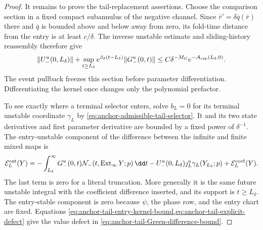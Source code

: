\begin{proof}
It remains to prove the tail-replacement assertions.  Choose the comparison
section in a fixed compact subannulus of the negative channel.  Since
\(\bar r'=\delta\bar q(\bar r)\) there and \(\bar q\) is bounded above and
below away from zero, its fold-time distance from the entry is at least
\(c/\delta\).  The inverse unstable estimate and sliding-history
reassembly therefore give
\begin{equation}
 \|U_-^u(0,L_\delta)\|
 +\sup_{t\ge L_\delta}
    e^{\beta_\delta(t-L_\delta)}
      \|G_-^u(0,t)\|
 \le C\delta^{-M_G}
       e^{-\mathcal A_{\rm cap}(L_\delta,0)}.        \label{eq:anchor-tail-entry-kernel-bound}
\end{equation}
The event pullback freezes this section before parameter differentiation.
Differentiating the kernel once changes only the polynomial prefactor.

To see exactly where a terminal selector enters, solve
\(b_L=0\) for its terminal unstable coordinate
\(\gamma_L\) by
\cref{eq:anchor-admissible-tail-selector}.  It and its two state
derivatives and first parameter derivative are bounded by a fixed power of
\(\delta^{-1}\).  The entry-unstable component of the difference between
the infinite and finite mixed maps is
\begin{equation}
 \mathcal E_L^{\rm ent}(Y)
 =-\int_{L_\delta}^{\infty}
       G_-^u(0,t)\mathcal N_-
          (t,\operatorname{Ext}_\infty Y;p)\,\dd t
   -U_-^u(0,L_\delta)\jmath_L^u
       \gamma_L(Y_{L_\delta};p)
   +\mathcal E_L^{\rm coef}(Y).                    \label{eq:anchor-tail-explicit-defect}
\end{equation}
The last term is zero for a literal truncation.  More generally it is the
same future unstable integral with the coefficient difference inserted,
and its support is \(t\ge L_\delta\).  The entry-stable component is zero
because \(\psi\), the phase row, and the entry chart are fixed.  Equations
\cref{eq:anchor-tail-entry-kernel-bound,eq:anchor-tail-explicit-defect}
give the value defect in
\cref{eq:anchor-tail-Green-difference-bound}.


\end{proof}
